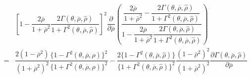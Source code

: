 \documentclass[10pt]{article}
\begin{document}
{\footnotesize \begin{eqnarray*}
& & \left[ 1 - \dfrac{2 \overline{\rho}}{1 + \overline{\rho}^2} \dfrac{2 \Gamma (\theta, \overline{\rho}, {\hat \rho})}{1 + \Gamma^2 (\theta, \overline{\rho}, {\hat \rho})} \right]^2 \dfrac{\partial}{\partial \overline{\rho}} \left( \dfrac{\dfrac{2 \overline{\rho}}{1 + \overline{\rho}^2} - \dfrac{2 \Gamma (\theta, \overline{\rho}, {\hat \rho})}{1 + \Gamma^2 (\theta, \overline{\rho}, {\hat \rho})}}{1 - \dfrac{2 \overline{\rho}}{1 + \overline{\rho}^2} \dfrac{2 \Gamma (\theta, \overline{\rho}, {\hat \rho})}{1 + \Gamma^2 (\theta, \overline{\rho}, {\hat \rho})}} \right) \\
& = & \dfrac{2 (1 - \overline{\rho}^2)}{(1 + \overline{\rho}^2)^2} \dfrac{\{ 1 - \Gamma^2 (\theta, \overline{\rho}, {\hat \rho}) \}^2}{\{ 1 + \Gamma^2 (\theta, \overline{\rho}, {\hat \rho}) \}^2} - \dfrac{2 \{ 1 - \Gamma^2 (\theta, \overline{\rho}, {\hat \rho}) \}}{\{ 1 + \Gamma^2 (\theta, \overline{\rho}, {\hat \rho}) \}^2} \dfrac{(1 - \overline{\rho}^2)^2}{(1 + \overline{\rho}^2)^2} \dfrac{\partial \Gamma (\theta, \overline{\rho}, {\hat \rho})}{\partial \overline{\rho}} \\

\end{eqnarray*}}
\end{document}
